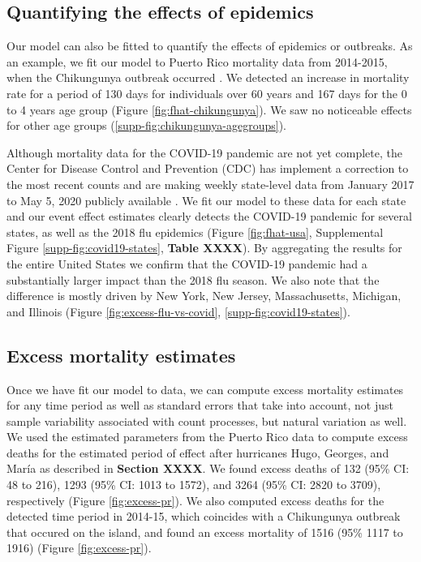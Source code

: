 \documentclass[11pt]{article}
\begin{document}
\subsection{Quantifying the effects of epidemics}
\label{subsec:epidemics}
Our model can also be fitted to quantify the effects of epidemics or outbreaks. As an example, 
we fit our model to Puerto Rico mortality data from 2014-2015, when the Chikungunya outbreak occurred \cite{sharp2016surveillance, hsu2019risk}. We detected an increase in mortality rate for a period of 130 days for individuals over 60 years and 167 days for the 0 to 4 years age group (Figure \ref{fig:fhat-chikungunya}). We saw no noticeable effects for other age groups (\ref{supp-fig:chikungunya-agegroups}).

Although mortality data for the COVID-19 pandemic are not yet complete, the Center for Disease Control and Prevention (CDC) has implement a correction to the most recent counts and are making weekly state-level data from January 2017 to May 5, 2020 publicly available \cite{cdc2020covid19}. We fit our model to these data for each state and our event effect estimates clearly detects the COVID-19 pandemic for several states, as well as the 2018 flu epidemics (Figure \ref{fig:fhat-usa}, Supplemental Figure \ref{supp-fig:covid19-states}, \textbf{Table XXXX}). By aggregating the results for the entire United States we confirm that the COVID-19 pandemic had a substantially larger impact than the 2018 flu season. We also note that the difference is mostly driven by New York, New Jersey, Massachusetts, Michigan, and Illinois (Figure \ref{fig:excess-flu-vs-covid}, \ref{supp-fig:covid19-states}).

\subsection{Excess mortality estimates}
\label{subsec:excess-mortality}
Once we have fit our model to data, we can compute excess mortality estimates for any time period as well as standard errors that take into account, not just sample variability associated with count processes, but natural variation as well. We used the estimated parameters from the Puerto Rico data to compute excess deaths for the estimated period of effect after hurricanes Hugo, Georges, and Mar\'ia as described in \textbf{Section XXXX}. We found excess deaths of 132 (95\% CI: 48 to 216), 1293 (95\% CI: 1013 to 1572), and 3264 (95\% CI: 2820 to 3709), respectively (Figure \ref{fig:excess-pr}). We also computed excess deaths for the detected time period in 2014-15, which coincides with a Chikungunya outbreak that occured on the island, and found an excess mortality of 1516 (95\% 1117 to 1916) (Figure \ref{fig:excess-pr}).
\end{document}
